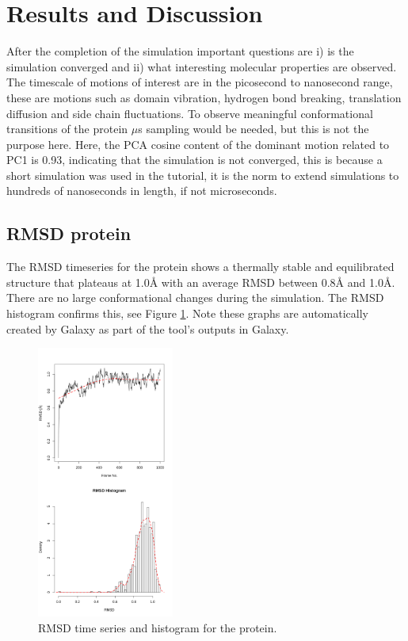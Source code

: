 \documentclass[twocolumn]{bmcart}%
\begin{document}
\hypertarget{resultsanddiscussion}{%
\section*{Results and Discussion}\label{resultsanddiscussion}}
After the completion of the simulation important questions are i) is the simulation converged and ii) what interesting molecular properties are observed. The timescale of motions of interest are in the picosecond to nanosecond range, these are motions such as domain vibration, hydrogen bond breaking, translation diffusion and side chain fluctuations. To observe meaningful conformational transitions of the protein $\mu$s sampling would be needed, but this is not the purpose here. Here, the PCA cosine content of the dominant motion related to PC1 is 0.93, indicating that the simulation is not converged, this is because a short simulation was used in the tutorial, it is the norm to extend simulations to hundreds of nanoseconds in length, if not microseconds.

\subsection*{RMSD protein}
The RMSD timeseries for the protein shows a thermally stable and equilibrated structure that plateaus at 1.0{\AA} with an average RMSD between 0.8{\AA} and 1.0{\AA}. There are no large conformational changes during the simulation. The RMSD histogram confirms this, see Figure \ref{fig:rmsdprotein}. Note these graphs are automatically created by Galaxy as part of the tool's outputs in Galaxy.

\begin{figure}[ht!]
  \includegraphics[width=0.4\textwidth]{htmd_analysis_rmsd1_merge}
  \caption{
      RMSD time series and histogram for the protein.}
  \label{fig:rmsdprotein}
\end{figure}
\end{document}
